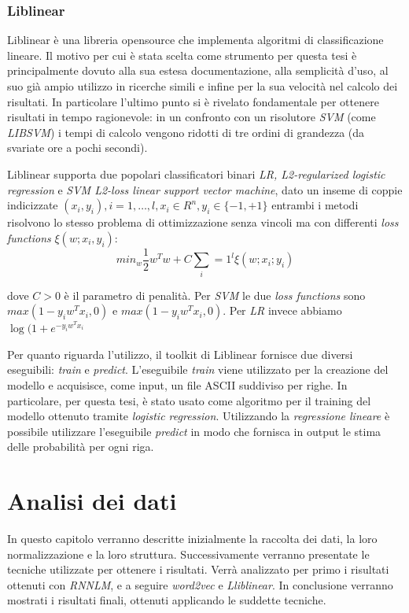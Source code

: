 \documentclass[a4paper,12pt,openright,twoside]{report}
\theoremstyle{definition}
\begin{document}
\subsection{Liblinear}
Liblinear è una libreria opensource che implementa algoritmi di classificazione lineare. Il motivo
per cui è stata scelta come strumento per questa
tesi è principalmente dovuto alla sua estesa documentazione, alla semplicità
d'uso, al suo già ampio utilizzo in ricerche simili e infine per la sua velocità nel calcolo dei risultati. 
In particolare l'ultimo punto si è rivelato fondamentale
per ottenere risultati in tempo ragionevole: in un confronto con un risolutore \emph{SVM} (come \emph{LIBSVM})
i tempi di calcolo vengono ridotti di tre ordini di grandezza (da svariate ore a pochi secondi).

Liblinear supporta due popolari classificatori binari \emph{LR, L2-regularized logistic regression} e 
\emph{SVM L2-loss linear support vector machine}, dato un inseme di coppie
indicizzate $(x_i,y_i),i=1,\dots{},l,x_i\in R^n, y_i \in \{-1,+1\}$ entrambi i metodi risolvono lo stesso
problema di ottimizzazione senza vincoli ma con differenti \emph{loss functions} $\xi(w;x_i,y_i)$:
\begin{equation}
	min_w \frac{1}{2}w^Tw+C\sum_i=1^l\xi(w;x_i;y_i)
	\label{eqn:liblinear1}
\end{equation}

dove $C > 0$ è il parametro di penalità. Per \emph{SVM} le due \emph{loss functions} sono $max(1-y_iw^Tx_i,0)$ e
$max(1-y_iw^Tx_i,0)$. Per \emph{LR} invece abbiamo $\log(1+e^{-y_iw^Tx_i}$

Per quanto riguarda l'utilizzo, il toolkit di Liblinear fornisce due diversi eseguibili: \emph{train} e 
\emph{predict}.
L'eseguibile \emph{train} viene utilizzato per la creazione del modello e acquisisce, come input, un file
ASCII suddiviso per righe. In particolare, per questa tesi, è stato usato come algoritmo 
per il training del modello ottenuto tramite \emph{logistic regression}.
Utilizzando la \emph{regressione lineare} è possibile utilizzare l'eseguibile \emph{predict} in modo 
che fornisca in output le stima delle probabilità per ogni riga.

\chapter{Analisi dei dati}
In questo capitolo verranno descritte inizialmente la raccolta dei dati, 
la loro normalizzazione e la loro struttura. 
Successivamente verranno presentate le tecniche utilizzate per ottenere i risultati.
 Verrà analizzato per primo i risultati ottenuti con \emph{RNNLM}, 
 e a seguire \emph{word2vec} e \emph{Lliblinear}.
 In conclusione verranno mostrati i risultati finali, ottenuti applicando le suddette tecniche.
\end{document}
